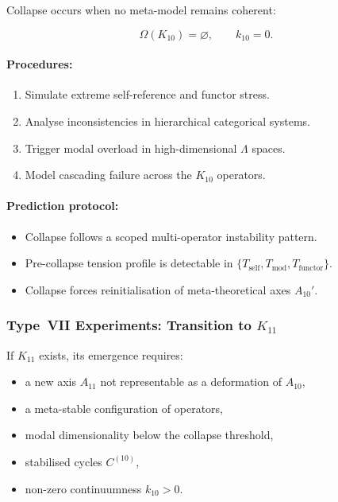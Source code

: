 Collapse occurs when no meta-model remains coherent:

\[
    \Omega(K_{10}) = \varnothing,\qquad k_{10} = 0.
\]

\paragraph{Procedures:}

\begin{enumerate}
    \item Simulate extreme self-reference and functor stress.
    \item Analyse inconsistencies in hierarchical categorical systems.
    \item Trigger modal overload in high-dimensional $\Lambda$ spaces.
    \item Model cascading failure across the $K_{10}$ operators.
\end{enumerate}

\paragraph{Prediction protocol:}

\begin{itemize}
    \item Collapse follows a scoped multi-operator instability pattern.
    \item Pre-collapse tension profile is detectable in 
          $\{T_{\mathrm{self}}, T_{\mathrm{mod}}, T_{\mathrm{functor}}\}$.
    \item Collapse forces reinitialisation of meta-theoretical axes 
          $A_{10}'$.
\end{itemize}



\subsubsection{Type~VII Experiments: Transition to $K_{11}$}

If $K_{11}$ exists, its emergence requires:

\begin{itemize}
    \item a new axis $A_{11}$ not representable as 
          a deformation of $A_{10}$,
    \item a meta-stable configuration of operators,
    \item modal dimensionality below the collapse threshold,
    \item stabilised cycles $C^{(10)}$,
    \item non-zero continuumness $k_{10} > 0$.
\end{itemize}

